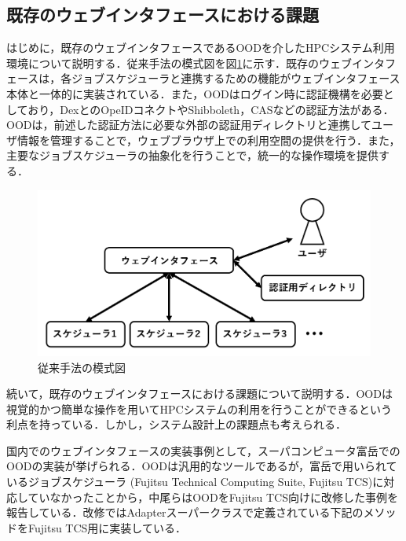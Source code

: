 \subsection{既存のウェブインタフェースにおける課題}
はじめに，既存のウェブインタフェースであるOODを介したHPCシステム利用環境について説明する．従来手法の模式図を図\ref{fig5}に示す．既存のウェブインタフェースは，各ジョブスケジューラと連携するための機能がウェブインタフェース本体と一体的に実装されている．また，OODはログイン時に認証機構を必要としており，DexとのOpeIDコネクト\cite{dex}\cite{openidconnect}やShibboleth\cite{shibboleth}，CAS\cite{CAS}などの認証方法がある．OODは，前述した認証方法に必要な外部の認証用ディレクトリと連携してユーザ情報を管理することで，ウェブブラウザ上での利用空間の提供を行う．また，主要なジョブスケジューラの抽象化を行うことで，統一的な操作環境を提供する．\par

\begin{figure}[b]
    \centering
    \includegraphics[width=120mm]{./fig/conventional_method.png}
    \caption{従来手法の模式図}
    \label{fig5}
\end{figure}

続いて，既存のウェブインタフェースにおける課題について説明する．OODは視覚的かつ簡単な操作を用いてHPCシステムの利用を行うことができるという利点を持っている．しかし，システム設計上の課題点も考えられる．\par
国内でのウェブインタフェースの実装事例として，スーパコンピュータ富岳でのOODの実装が挙げられる．OODは汎用的なツールであるが，富岳で用いられているジョブスケジューラ (Fujitsu Technical Computing Suite, Fujitsu TCS)に対応していなかったことから，中尾らはOODをFujitsu TCS向けに改修した事例を報告している\cite{cite4}．改修ではAdapterスーパークラスで定義されている下記のメソッドをFujitsu TCS用に実装している．\par

